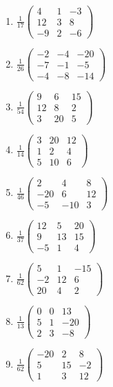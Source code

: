 \begin{enumerate}[label=\arabic*., leftmargin=*, itemsep=1pt]
\item $\frac{1}{17}\left(\begin{smallmatrix}4 & 1 & -3\\ 12 & 3 & 8\\ -9 & 2 & -6\end{smallmatrix}\right)$
\item $\frac{1}{26}\left(\begin{smallmatrix}-2 & -4 & -20\\ -7 & -1 & -5\\ -4 & -8 & -14\end{smallmatrix}\right)$
\item $\frac{1}{54}\left(\begin{smallmatrix}9 & 6 & 15\\ 12 & 8 & 2\\ 3 & 20 & 5\end{smallmatrix}\right)$
\item $\frac{1}{14}\left(\begin{smallmatrix}3 & 20 & 12\\ 1 & 2 & 4\\ 5 & 10 & 6\end{smallmatrix}\right)$
\item $\frac{1}{46}\left(\begin{smallmatrix}2 & 4 & 8\\ -20 & 6 & 12\\ -5 & -10 & 3\end{smallmatrix}\right)$
\item $\frac{1}{37}\left(\begin{smallmatrix}12 & 5 & 20\\ 9 & 13 & 15\\ -5 & 1 & 4\end{smallmatrix}\right)$
\item $\frac{1}{62}\left(\begin{smallmatrix}5 & 1 & -15\\ -2 & 12 & 6\\ 20 & 4 & 2\end{smallmatrix}\right)$
\item $\frac{1}{13}\left(\begin{smallmatrix}0 & 0 & 13\\ 5 & 1 & -20\\ 2 & 3 & -8\end{smallmatrix}\right)$
\item $\frac{1}{62}\left(\begin{smallmatrix}-20 & 2 & 8\\ 5 & 15 & -2\\ 1 & 3 & 12\end{smallmatrix}\right)$

\end{enumerate}

